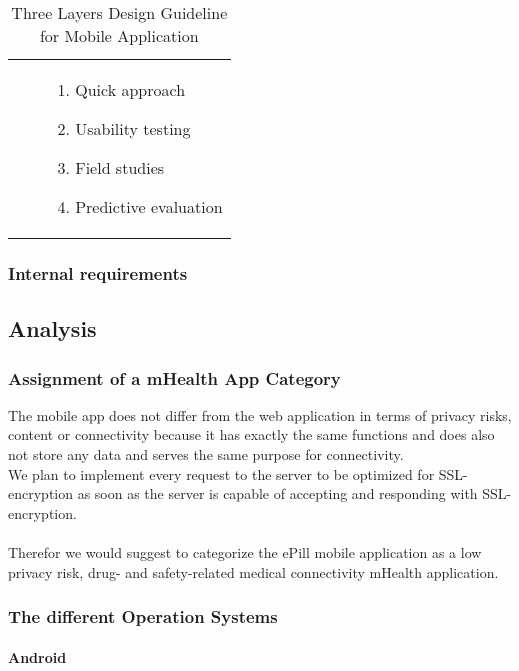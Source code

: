 \begin{table}[!htb]
\begin{tabular}{c | c | p{23.5em}}
        \cline{3-3}
        & & 
            \begin{enumerate}
                \item Quick approach
                \item Usability testing
                \item Field studies
                \item Predictive evaluation
            \end{enumerate}
        \\
    \end{tabular}
    \caption[Three Layers Design Guideline for Mobile Application]{Three Layers Design Guideline for Mobile Application\footnotemark}
    \label{tab:ThreeLayersDesignGuideline}
\end{table}

\subsubsection{Internal requirements}
\subsection{Analysis}
\label{sec:Analysis}
\subsubsection{Assignment of a mHealth App Category}
The mobile app does not differ from the web application in terms of privacy risks, content or connectivity because it has exactly the same functions and does also not store any data and serves the same purpose for connectivity.
\\
We plan to implement every request to the server to be optimized for SSL-encryption as soon as the server is capable of accepting and responding with SSL-encryption. 
\\
\\
Therefor we would suggest to categorize the ePill mobile application as a low privacy risk, drug- and safety-related medical connectivity mHealth application.

\subsubsection{The different Operation Systems}
\paragraph{Android}
